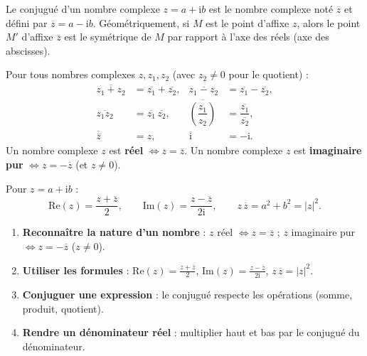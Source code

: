 \documentclass[11pt]{article}
\newcommand{\cle}[1]{{\popxbold\color{popdark}#1}}
\begin{document}
\begin{definition}
Le \cle{conjugué} d'un nombre complexe $z = a + \mathrm{i}b$ est le nombre complexe noté $\overline{z}$ et défini par $\overline{z} = a - \mathrm{i}b$.
Géométriquement, si $M$ est le point d'affixe $z$, alors le point $M'$ d'affixe $\overline{z}$ est le symétrique de $M$ par rapport à l'axe des réels (axe des abscisses).
\end{definition}

\begin{propriete}
Pour tous nombres complexes $z, z_1, z_2$ (avec $z_2 \neq 0$ pour le quotient) :
\begin{align*}
\overline{z_1 + z_2} &= \overline{z_1} + \overline{z_2}, &
\overline{z_1 - z_2} &= \overline{z_1} - \overline{z_2}, \\
\overline{z_1 z_2} &= \overline{z_1}\,\overline{z_2}, &
\overline{\left(\dfrac{z_1}{z_2}\right)} &= \dfrac{\overline{z_1}}{\overline{z_2}}, \\
\overline{\overline{z}} &= z, &
\overline{\mathrm{i}} &= -\mathrm{i}.
\end{align*}
Un nombre complexe $z$ est \textbf{réel} $\iff z = \overline{z}$.
Un nombre complexe $z$ est \textbf{imaginaire pur} $\iff z = -\overline{z}$ (et $z \neq 0$).
\end{propriete}

\begin{propriete}
Pour $z = a + \mathrm{i}b$ :
\[
\mathrm{Re}(z) = \dfrac{z + \overline{z}}{2}, \qquad
\mathrm{Im}(z) = \dfrac{z - \overline{z}}{2\mathrm{i}}, \qquad
z\,\overline{z} = a^2 + b^2 = |z|^2.
\]
\end{propriete}

\begin{methode}
\begin{enumerate}
\item \textbf{Reconnaître la nature d'un nombre} : $z$ réel $\iff z = \overline{z}$ ; $z$ imaginaire pur $\iff z = -\overline{z}$ ($z \neq 0$).
\item \textbf{Utiliser les formules} : $\mathrm{Re}(z) = \frac{z + \overline{z}}{2}$, $\mathrm{Im}(z) = \frac{z - \overline{z}}{2\mathrm{i}}$, $z\,\overline{z} = |z|^2$.
\item \textbf{Conjuguer une expression} : le conjugué respecte les opérations (somme, produit, quotient).
\item \textbf{Rendre un dénominateur réel} : multiplier haut et bas par le conjugué du dénominateur.
\end{enumerate}
\end{methode}
\end{document}
